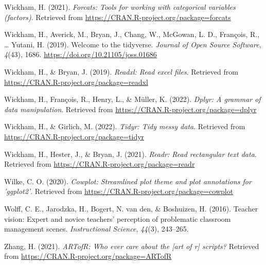 \documentclass[
  man,floatsintext]{apa6}
\newlength{\cslhangindent}
\newlength{\cslentryspacingunit} %
\newenvironment{CSLReferences}[2] %
 {%
  \setlength{\parindent}{0pt}
  \ifodd #1
  \let\oldpar\par
  \def\par{\hangindent=\cslhangindent\oldpar}
  \fi
  \setlength{\parskip}{#2\cslentryspacingunit}
 }%
 {}
\begin{document}
\begin{CSLReferences}{1}{0}
\leavevmode{}%
Wickham, H. (2021). \emph{Forcats: Tools for working with categorical variables (factors)}. Retrieved from \url{https://CRAN.R-project.org/package=forcats}

\leavevmode{}%
Wickham, H., Averick, M., Bryan, J., Chang, W., McGowan, L. D., François, R., \ldots{} Yutani, H. (2019). Welcome to the {tidyverse}. \emph{Journal of Open Source Software}, \emph{4}(43), 1686. \url{https://doi.org/10.21105/joss.01686}

\leavevmode{}%
Wickham, H., \& Bryan, J. (2019). \emph{Readxl: Read excel files}. Retrieved from \url{https://CRAN.R-project.org/package=readxl}

\leavevmode{}%
Wickham, H., François, R., Henry, L., \& Müller, K. (2022). \emph{Dplyr: A grammar of data manipulation}. Retrieved from \url{https://CRAN.R-project.org/package=dplyr}

\leavevmode{}%
Wickham, H., \& Girlich, M. (2022). \emph{Tidyr: Tidy messy data}. Retrieved from \url{https://CRAN.R-project.org/package=tidyr}

\leavevmode{}%
Wickham, H., Hester, J., \& Bryan, J. (2021). \emph{Readr: Read rectangular text data}. Retrieved from \url{https://CRAN.R-project.org/package=readr}

\leavevmode{}%
Wilke, C. O. (2020). \emph{Cowplot: Streamlined plot theme and plot annotations for 'ggplot2'}. Retrieved from \url{https://CRAN.R-project.org/package=cowplot}

\leavevmode{}%
Wolff, C. E., Jarodzka, H., Bogert, N. van den, \& Boshuizen, H. (2016). Teacher vision: Expert and novice teachers' perception of problematic classroom management scenes. \emph{Instructional Science}, \emph{44}(3), 243--265.

\leavevmode{}%
Zhang, H. (2021). \emph{ARTofR: Who ever care about the {[}art of r{]} scripts?} Retrieved from \url{https://CRAN.R-project.org/package=ARTofR}

\end{CSLReferences}

\endgroup


\clearpage
\renewcommand{\listfigurename}{Figure captions}

\clearpage
\renewcommand{\listtablename}{Table captions}
\end{document}
